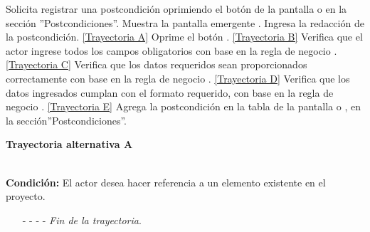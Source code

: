 	\begin{UCtrayectoria}
		\UCpaso[\UCactor] Solicita registrar una postcondición oprimiendo el botón  de la pantalla  o  en la sección ''Postcondiciones''.
		\UCpaso[\UCsist] Muestra la pantalla emergente .
		\UCpaso[\UCactor] Ingresa la redacción de la postcondición. \hyperlink{CU12-1-4:TAA}{[Trayectoria A]} \label{CU12.1.4-P3}
		\UCpaso[\UCactor] Oprime el botón . \hyperlink{CU12-1-4:TAB}{[Trayectoria B]} 
		\UCpaso[\UCsist] Verifica que el actor ingrese todos los campos obligatorios con base en la regla de negocio . \hyperlink{CU12-1-4:TAC}{[Trayectoria C]}
		\UCpaso[\UCsist] Verifica que los datos requeridos sean proporcionados correctamente con base en la regla de negocio . \hyperlink{CU12-1-4:TAD}{[Trayectoria D]}
		\UCpaso[\UCsist] Verifica que los datos ingresados cumplan con el formato requerido, con base en la regla de negocio . \hyperlink{CU12-1-4:TAE}{[Trayectoria E]}
		\UCpaso[\UCsist] Agrega la postcondición en la tabla de la pantalla  o , en la sección''Postcondiciones''.
	\end{UCtrayectoria}		
\hypertarget{CU12-1-4:TAA}{\textbf{Trayectoria alternativa A}}\\
\noindent \textbf{Condición:} El actor desea hacer referencia a un elemento existente en el proyecto.
\begin{enumerate}
	\UCpaso[\UCactor] Ingresa el token correspondiente al elemento a referenciar.
	\UCpaso[\UCsist] Verifica que los tokens utilizados se encuentren correctamente estructurados, con base en la regla de negocio . 
	\UCpaso[\UCsist] Obtiene los \hyperlink{tElemento}{elementos} registrados en el proyecto correspondientes al token ingresado. 
	\UCpaso[\UCsist] Muestra una lista con los \hyperlink{tElemento}{elementos} encontrados.
	\UCpaso[\UCactor] Selecciona un elemento de la lista.
	\UCpaso[\UCsist] Verifica que el nombre del elemento seleccionado no contenga espacios. \hyperlink{CU12-1-4:TAF}{[Trayectoria F]}
	\UCpaso[\UCsist] Agrega la referencia del elemento al texto. \label{CU12.1.4-TA1}
	\UCpaso Continúa en el paso \ref{CU12.1.4-P3} de la trayectoria principal.
	\item[- -] - - {\em {Fin de la trayectoria}}.%
\end{enumerate}
